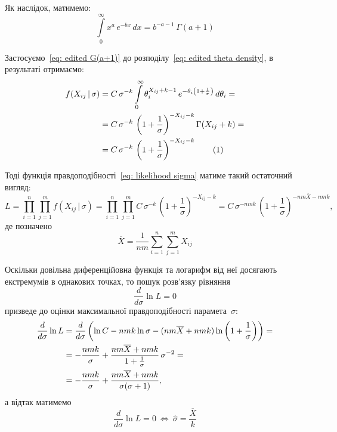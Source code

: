 Як наслідок, матимемо:
\begin{equation}\label{eq: edited G(a+1)}
    \int\limits_{0}^{\infty}x^{a}\,e^{-bx}\,dx = b^{-a-1}\,\Gamma(a+1)
\end{equation}

Застосуємо~\eqref{eq: edited G(a+1)} до розподілу~\eqref{eq: edited theta density}, в результаті отримаємо:
\begin{align*}\label{eq: final theta density}
    f(X_{ij} \,|\, \sigma) & = C \, \sigma^{-k} \int\limits_{0}^{\infty} \theta_{i}^{X_{ij}+k-1}\, e^{-\theta_{i}\left( 1+\frac{1}{\sigma} \right)} \, d\theta_i = \\
    & = C \, \sigma^{-k}\, \left( 1+\frac{1}{\sigma}\right)^{-X_{ij}-k}\Gamma(X_{ij}+k) = \\
    & = C \, \sigma^{-k}\, \left( 1+\frac{1}{\sigma}\right)^{-X_{ij}-k} \stepcounter{equation}\tag{\theequation}
\end{align*}

Тоді функція правдоподібності~\eqref{eq: likelihood sigma} матиме такий остаточний вигляд:
\begin{equation}
    L = \prod\limits_{i=1}^{n} \prod\limits_{j=1}^{m} f(X_{ij} \,|\, \sigma) = \prod\limits_{i=1}^{n} \prod\limits_{j=1}^{m} C \, \sigma^{-k}\, \left( 1+\frac{1}{\sigma}\right)^{-X_{ij}-k} = C \, \sigma^{-nmk}\, \left( 1+\frac{1}{\sigma}\right)^{-nm\overline{X}-nmk},
\end{equation}
де позначено
\begin{equation}
    \overline{X} = \frac{1}{nm}\sum\limits_{i=1}^{n} \sum\limits_{j=1}^{m} X_{ij}
\end{equation}

Оскільки довільна диференційовна функція та логарифм від неї досягають екстремумів в однакових точках, то пошук розв'язку рівняння
\begin{equation}
    \frac{d}{d\sigma} \ln{L} = 0
\end{equation}
призведе до оцінки максимальної правдоподібності парамета~$\sigma:$
\begin{align}
    \frac{d}{d\sigma} \ln{L} & = \frac{d}{d\sigma} \left( \ln{C} - nmk\ln{\sigma} - (nm\overline{X}+nmk)\ln{\left( 1+\frac{1}{\sigma} \right)} \right) = \notag \\
    & = -\frac{nmk}{\sigma} + \frac{nm\overline{X}+nmk}{1+\frac{1}{\sigma}}\,\sigma^{-2} = \notag \\
    & = -\frac{nmk}{\sigma} + \frac{nm\overline{X}+nmk}{\sigma(\sigma+1)},
\end{align}
а відтак матимемо
\begin{equation}\label{eq: sigma MLE}
    \frac{d}{d\sigma} \ln{L} = 0 \ \Longleftrightarrow \ \widehat{\sigma} = \frac{\overline{X}}{k}
\end{equation}

